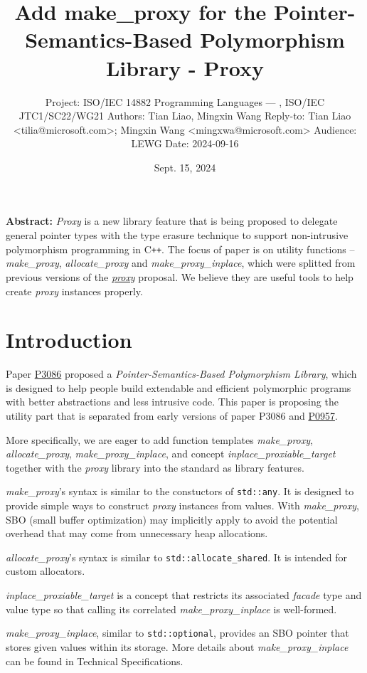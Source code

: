 \documentclass[10pt, a4paper, oneside]{article}
\title{Add make\_proxy for the Pointer-Semantics-Based
Polymorphism Library - Proxy}
\date{Sept. 15, 2024}
\author{%
\medbreak
Project: ISO/IEC 14882 Programming Languages — \Cpp{}, ISO/IEC JTC1/SC22/WG21\smallbreak
Authors: Tian Liao, Mingxin Wang\smallbreak
Reply-to: Tian Liao \textless tilia@microsoft.com\textgreater; Mingxin Wang \textless mingxwa@microsoft.com\textgreater \smallbreak
Audience: LEWG\smallbreak
Date: 2024-09-16
}
\makeatletter
\newcommand{\Cpp}{C\texttt{++}}
\renewcommand{\maketitle}{\bgroup\setlength{\parindent}{0pt}
\begin{flushleft}
  \textbf{\huge \@title}

  \@author
\end{flushleft}\egroup
}
\makeatother
\begin{document}
\maketitle

\textbf{Abstract:} \textit{Proxy} is a new library feature that is being proposed to delegate general pointer types
with the type erasure technique to support non-intrusive polymorphism programming in \Cpp.
The focus of paper is on utility functions -- \textit{make\_proxy}, \textit{allocate\_proxy} and \textit{make\_proxy\_inplace},
which were splitted from previous versions of the \href{https://wg21.link/p3086r1}{\textit{proxy}} proposal.
We believe they are useful tools to help create \textit{proxy} instances properly.

\section{Introduction}

Paper \href{https://wg21.link/p3086}{P3086} proposed a \textit{Pointer-Semantics-Based Polymorphism Library},
which is designed to help people build extendable and efficient polymorphic programs with better abstractions and less intrusive code.
This paper is proposing the utility part that is separated from early versions of paper P3086 and \href{https://wg21.link/p0957}{P0957}.

More specifically, we are eager to add function templates \textit{make\_proxy}, \textit{allocate\_proxy}, \textit{make\_proxy\_inplace},
and concept \textit{inplace\_proxiable\_target} together with the \textit{proxy} library into the standard as library features.

\textit{make\_proxy}'s syntax is similar to the constuctors of \verb|std::any|.
It is designed to provide simple ways to construct \textit{proxy} instances from values.
With \textit{make\_proxy}, SBO (small buffer optimization) may implicitly apply to avoid the potential overhead that may come from unnecessary heap allocations.

\textit{allocate\_proxy}'s syntax is similar to \verb|std::allocate_shared|. It is intended for custom allocators.

\textit{inplace\_proxiable\_target} is a concept that restricts its associated \textit{facade} type and value type
so that calling its correlated \textit{make\_proxy\_inplace} is well-formed.

\textit{make\_proxy\_inplace}, similar to \verb|std::optional|,
provides an SBO pointer that stores given values within its storage.
More details about \textit{make\_proxy\_inplace} can be found in Technical Specifications.
\end{document}

